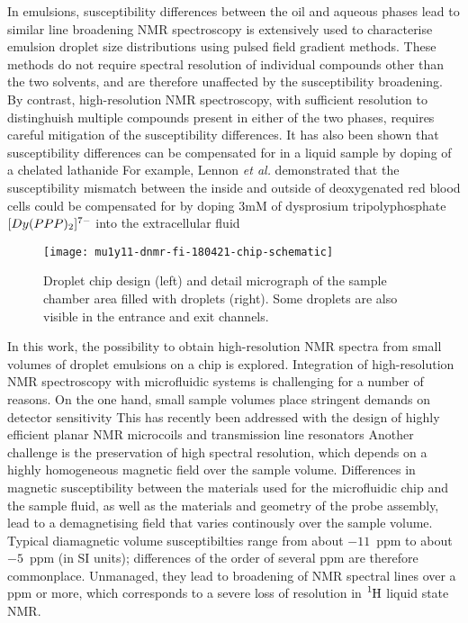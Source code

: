 In emulsions, susceptibility differences between the oil and aqueous phases
lead to similar line broadening\citep{Kuchel:2003ip} NMR spectroscopy is extensively
used to characterise emulsion droplet size distributions using pulsed
field gradient methods\citep{VANDENENDEN:1990ck,FOUREL:1994jv,
Hollingsworth:2004iy,Hindmarsh:2005en,Johns:2009ib,Bernewitz:2011km,Lingwood:2012je}.
These methods do not require spectral resolution of individual
compounds other than the two solvents, and are therefore
unaffected by the susceptibility broadening. By contrast, high-resolution
NMR spectroscopy, with sufficient resolution to distinghuish multiple
compounds present in either of the two phases,
requires careful mitigation of the susceptibility differences. It has also been shown that susceptibility differences can be compensated for in a liquid sample by doping of a chelated lathanide\citep{fabry1983effect}
For example, Lennon \emph{et al.} demonstrated that the susceptibility mismatch between the inside and outside of deoxygenated red blood cells could be
compensated for by doping 3mM of dysprosium tripolyphosphate $\ce[{Dy(PPP)_2}]^{7-}$ into the extracellular fluid\citep{lennon1994hemoglobin}

\begin{figure}
  \begin{center}
    \texttt{[image: mu1y11-dnmr-fi-180421-chip-schematic]}
  \end{center}
  \caption{Droplet chip design (left) and detail micrograph of the sample chamber
  area filled with droplets (right). Some droplets are also visible in the
  entrance and exit channels.}
  \label{fig:chip-design}
\end{figure}

In this work, the possibility to obtain high-resolution NMR spectra from
small volumes of droplet emulsions on a chip is explored.
Integration of high-resolution NMR spectroscopy with microfluidic systems is
challenging for a number of reasons.
On the one hand, small sample volumes place stringent demands on detector
sensitivity\citep{Badilita:2011td,Zalesskiy:2014hi}
This has recently been addressed with the design of
highly efficient planar NMR microcoils\citep{Spengler:2016km} and
transmission line resonators\citep{Finch:2016gv}
Another challenge is the preservation of high spectral
resolution, which depends on a highly homogeneous magnetic field
over the sample volume. Differences in magnetic susceptibility
between the materials used for the microfluidic chip
and the sample fluid, as well as the materials and geometry
of the probe assembly, lead to a demagnetising field
that varies continously over the sample volume. Typical diamagnetic
volume susceptibilties range from about
$-11$~ppm to about $-5$~ppm (in SI units);\citep{Kuchel:2003ip,Durrant:2003kv}
differences of the order of several ppm are therefore commonplace.
Unmanaged, they lead to
broadening of NMR spectral lines over a ppm or more, which
corresponds to a severe loss of resolution in $\ce{^1H}$ liquid
state NMR.


